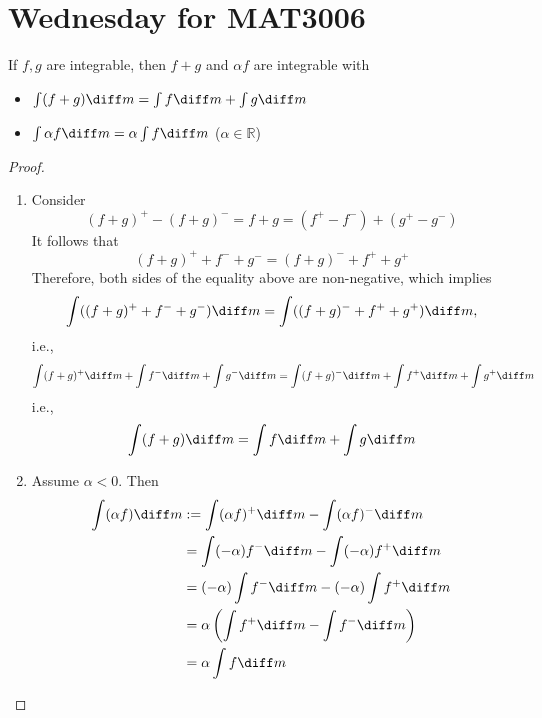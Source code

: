 
\section{Wednesday for MAT3006}
\begin{proposition}[Linearity]
If $f,g$ are integrable, then $f+g$ and $\alpha f$ are integrable with
\begin{itemize}
\item
$\int(f+g)\diff m = \int f\diff m+\int g\diff m$
\item
$\int\alpha f\diff m = \alpha\int f\diff m$ ($\alpha\in\mathbb{R}$)
\end{itemize}
\end{proposition}
\begin{proof}
\begin{enumerate}
\item
Consider 
\[
(f+g)^+ - (f+g)^- = f+g
=
(f^+ - f^-) + (g^+ - g^-)
\]
It follows that
\[
(f+g)^+ + f^- + g^- = (f+g)^- + f^++g^+
\]
Therefore, both sides of the equality above are non-negative, which implies
\[
\int((f+g)^+ + f^- + g^- )\diff m
=
\int((f+g)^- + f^++g^+ )\diff m,
\]
i.e., 
\[
\int (f+g)^+\diff m +\int f^-\diff m+\int g^-\diff m
=
\int(f+g)^-\diff m+\int f^+\diff m+\int g^+\diff m
\]
i.e.,
\[
\int(f+g)\diff m = \int f\diff m+\int g\diff m
\]
\item
Assume $\alpha<0$. Then
\begin{align*}
\int(\alpha f)\diff m&:=\int(\alpha f)^+\diff m - \int(\alpha f)^-\diff m\\
&=\int(-\alpha)f^-\diff m - \int(-\alpha)f^+\diff m\\
&=(-\alpha)\int f^-\diff m - (-\alpha)\int f^+\diff m\\
&=\alpha\left(\int f^+\diff m - \int f^-\diff m\right)\\
&=\alpha \int f\diff m
\end{align*}

\end{enumerate}
\end{proof}


